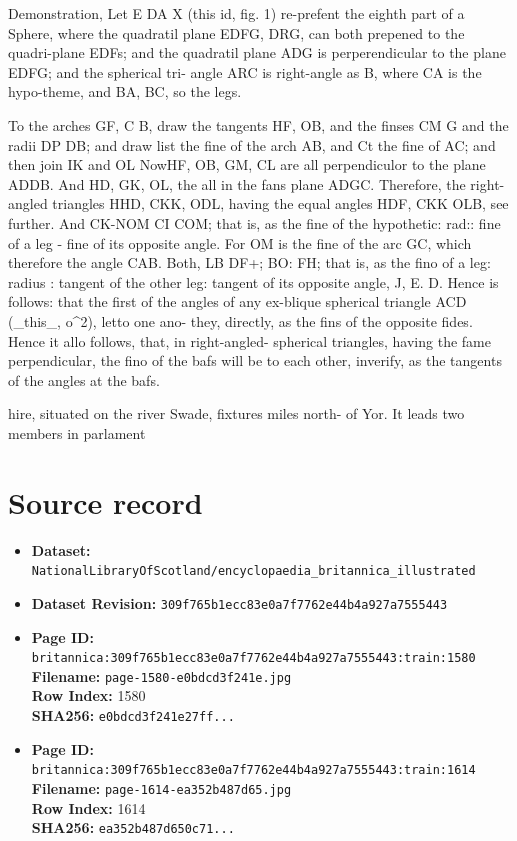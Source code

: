 \documentclass{article}
\begin{document}
Demonstration, Let E DA X (this id, fig. 1) re-prefent the eighth part of a Sphere, where the quadratil plane EDFG, DRG, can both prepened to the quadri-plane EDFs; and the quadratil plane ADG is perperendicular to the plane EDFG; and the spherical tri- angle ARC is right-angle as B, where CA is the hypo-theme, and BA, BC, so the legs.

To the arches GF, C B, draw the tangents HF, OB, and the finses CM G and the radii DP DB; and draw list the fine of the arch AB, and Ct the fine of AC; and then join IK and OL NowHF, OB, GM, CL are all perpendiculor to the plane ADDB. And HD, GK, OL, the all in the fans plane ADGC. Therefore, the right-angled triangles HHD, CKK, ODL, having the equal angles HDF, CKK OLB, see further. And CK-NOM CI COM; that is, as the fine of the hypothetic: rad:: fine of a leg - fine of its opposite angle. For OM is the fine of the arc GC, which therefore the angle CAB. Both, LB DF+; BO: FH; that is, as the fino of a leg: radius : tangent of the other leg: tangent of its opposite angle, J, E. D. Hence is follows: that the first of the angles of any ex-blique spherical triangle ACD (\_this\_, o\textasciicircum{}2), letto one ano- they, directly, as the fins of the opposite fides. Hence it allo follows, that, in right-angled- spherical triangles, having the fame perpendicular, the fino of the bafs will be to each other, inverify, as the tangents of the angles at the bafs.

hire, situated on the river Swade, fixtures miles north- of Yor. It leads two members in parlament



\section*{Source record}
\begin{itemize}
\item \textbf{Dataset:} \texttt{NationalLibraryOfScotland/encyclopaedia\_britannica\_illustrated}
\item \textbf{Dataset Revision:} \texttt{309f765b1ecc83e0a7f7762e44b4a927a7555443}
\item \textbf{Page ID:} \texttt{britannica:309f765b1ecc83e0a7f7762e44b4a927a7555443:train:1580} \\
  \textbf{Filename:} \texttt{page-1580-e0bdcd3f241e.jpg} \\
  \textbf{Row Index:} 1580 \\
  \textbf{SHA256:} \texttt{e0bdcd3f241e27ff...}
\item \textbf{Page ID:} \texttt{britannica:309f765b1ecc83e0a7f7762e44b4a927a7555443:train:1614} \\
  \textbf{Filename:} \texttt{page-1614-ea352b487d65.jpg} \\
  \textbf{Row Index:} 1614 \\
  \textbf{SHA256:} \texttt{ea352b487d650c71...}
\end{itemize}
\end{document}
